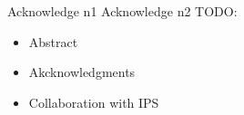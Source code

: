 \begin{acknowledgments}
	 Acknowledge n1
	\newline
	Acknowledge n2
	\newline
	\newline
	TODO: 
	\begin{itemize}
		\item Abstract
		\item Akcknowledgments
		\item Collaboration with IPS
	\end{itemize}
\end{acknowledgments}
